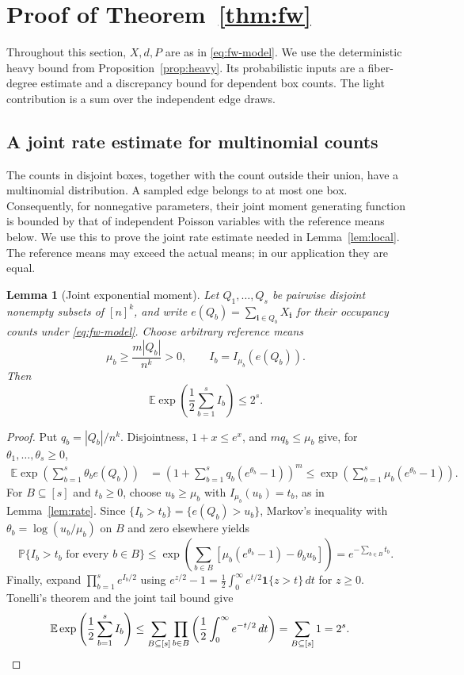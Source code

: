 \documentclass[11pt,reqno]{amsart}
\numberwithin{equation}{section}
\newtheorem{lemma}[theorem]{Lemma}
\theoremstyle{definition}
\theoremstyle{remark}
\newcommand{\E}{\mathbb E}
\newcommand{\Pp}{\mathbb P}
\newcommand{\one}{\mathbf 1}
\begin{document}
\section{Proof of Theorem~\ref{thm:fw}}\label{sec:fw-proof}

Throughout this section, $X,d,P$ are as in \eqref{eq:fw-model}.
We use the deterministic heavy bound from Proposition~\ref{prop:heavy}.
Its probabilistic inputs are a fiber-degree estimate and a discrepancy
bound for dependent box counts. The light contribution is a sum over
the independent edge draws.

\subsection{A joint rate estimate for multinomial counts}

The counts in disjoint boxes, together with the count outside their
union, have a multinomial distribution. A sampled edge belongs to at
most one box. Consequently, for nonnegative parameters, their joint
moment generating function is bounded by that of independent Poisson
variables with the reference means below. We use this to prove the
joint rate estimate needed in Lemma~\ref{lem:local}. The reference
means may exceed the actual means; in our application they are equal.

\begin{lemma}[Joint exponential moment]\label{lem:multinomial}
Let $Q_1,\ldots,Q_s$ be pairwise disjoint nonempty subsets of $[n]^k$,
and write $e(Q_b)=\sum_{\mathbf i\in Q_b}X_{\mathbf i}$ for their
occupancy counts under \eqref{eq:fw-model}.
Choose arbitrary reference means
\[
 \mu_b\ge \frac{m|Q_b|}{n^k}>0,
 \qquad I_b=I_{\mu_b}(e(Q_b)).
\]
Then
\begin{equation}\label{eq:mixed-mgf}
 \E\exp\left(\frac12\sum_{b=1}^s I_b\right)\le2^s.
\end{equation}
\end{lemma}
\begin{proof}
Put $q_b=|Q_b|/n^k$. Disjointness, $1+x\le e^x$, and
$mq_b\le\mu_b$ give, for $\theta_1,\ldots,\theta_s\ge0$,
\begin{align*}
 \E\exp\left(\sum_{b=1}^s\theta_be(Q_b)\right)
 &=\left(1+\sum_{b=1}^s q_b(e^{\theta_b}-1)\right)^m\le\exp\left(\sum_{b=1}^s\mu_b(e^{\theta_b}-1)\right).
\end{align*}
For $B\subseteq[s]$ and $t_b\ge0$, choose $u_b\ge\mu_b$ with
$I_{\mu_b}(u_b)=t_b$, as in Lemma~\ref{lem:rate}.
Since $\{I_b>t_b\}=\{e(Q_b)>u_b\}$, Markov's inequality with
$\theta_b=\log(u_b/\mu_b)$ on $B$ and zero elsewhere yields
\[
 \Pp\{I_b>t_b\text{ for every }b\in B\}
 \le \exp\left(\sum_{b\in B}
       [\mu_b(e^{\theta_b}-1)-\theta_bu_b]\right)
 =e^{-\sum_{b\in B}t_b}.
\]
Finally, expand $\prod_{b=1}^s e^{I_b/2}$ using
$e^{z/2}-1=\frac12\int_0^\infty e^{t/2}\one\{z>t\}\,dt$ for $z\ge0$.
Tonelli's theorem and the joint tail bound give
\begin{align*}
 \E\exp\left(\frac12\sum_{b=1}^s I_b\right)
 &\le\sum_{B\subseteq[s]}\prod_{b\in B}
 \left(\frac12\int_0^\infty e^{-t/2}\,dt\right)
 =\sum_{B\subseteq[s]}1=2^s.
 \qedhere
\end{align*}
\end{proof}
\end{document}

